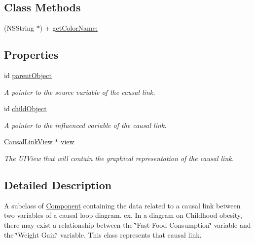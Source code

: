 \subsection*{Class Methods}
\begin{DoxyCompactItemize}
\item 
(N\-S\-String $\ast$) + \hyperlink{interface_causal_link_a58132842dd002d42efcdef8bd0d7ee79}{get\-Color\-Name\-:}
\end{DoxyCompactItemize}
\subsection*{Properties}
\begin{DoxyCompactItemize}
\item 
\hypertarget{interface_causal_link_a92793d006bbec1b2ac27bb8f580fe2af}{id \hyperlink{interface_causal_link_a92793d006bbec1b2ac27bb8f580fe2af}{parent\-Object}}\label{interface_causal_link_a92793d006bbec1b2ac27bb8f580fe2af}

\begin{DoxyCompactList}\small\item\em A pointer to the source variable of the causal link. \end{DoxyCompactList}\item 
\hypertarget{interface_causal_link_a89bb83f507d8a9c64e76958adfe99676}{id \hyperlink{interface_causal_link_a89bb83f507d8a9c64e76958adfe99676}{child\-Object}}\label{interface_causal_link_a89bb83f507d8a9c64e76958adfe99676}

\begin{DoxyCompactList}\small\item\em A pointer to the influenced variable of the causal link. \end{DoxyCompactList}\item 
\hypertarget{interface_causal_link_a698e70e52e27741aee1a7e5bfe44c468}{\hyperlink{interface_causal_link_view}{Causal\-Link\-View} $\ast$ \hyperlink{interface_causal_link_a698e70e52e27741aee1a7e5bfe44c468}{view}}\label{interface_causal_link_a698e70e52e27741aee1a7e5bfe44c468}

\begin{DoxyCompactList}\small\item\em The U\-I\-View that will contain the graphical representation of the causal link. \end{DoxyCompactList}\end{DoxyCompactItemize}


\subsection{Detailed Description}
A subclass of \hyperlink{interface_component}{Component} containing the data related to a causal link between two variables of a causal loop diagram. ex. In a diagram on Childhood obesity, there may exist a relationship between the \char`\"{}\-Fast Food Consumption\char`\"{} variable and the \char`\"{}\-Weight Gain\char`\"{} variable. This class represents that causal link. 

